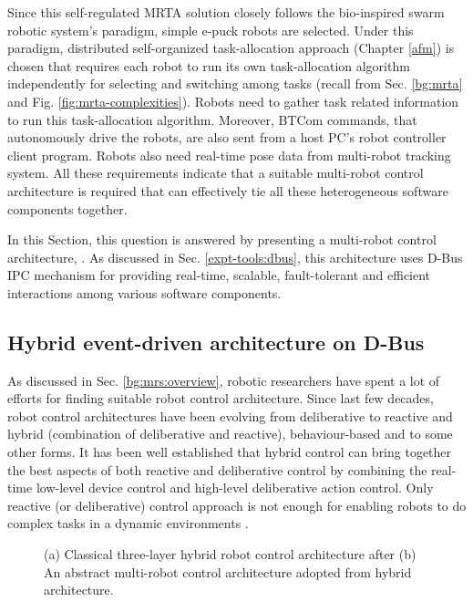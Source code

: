 Since  this self-regulated MRTA solution closely follows the bio-inspired swarm robotic system's paradigm,  simple e-puck robots are selected.  Under this paradigm,  distributed self-organized task-allocation approach (Chapter \ref{afm}) is chosen that requires each robot to run its own task-allocation algorithm independently for selecting and switching among tasks (recall from Sec. \ref{bg:mrta} and Fig. \ref{fig:mrta-complexities}).  Robots need to gather task related information to run this task-allocation algorithm. Moreover, BTCom  commands, that autonomously drive the robots, are also sent from a host PC's robot controller client program. Robots also need real-time pose data from multi-robot tracking system. All these requirements indicate that a suitable multi-robot control architecture is required that can effectively tie all these heterogeneous software components together.

In this Section,  this question is answered by presenting a multi-robot control architecture, .  As discussed in Sec. \ref{expt-tools:dbus}, this architecture uses D-Bus IPC mechanism for providing real-time, scalable, fault-tolerant and efficient interactions among various software components.
\subsection{Hybrid event-driven architecture on D-Bus}
As discussed in Sec. \ref{bg:mrs:overview}, robotic researchers have spent a lot of efforts for finding suitable robot control architecture. Since last few decades, robot control architectures have been evolving from deliberative to reactive and hybrid (combination of deliberative and reactive), behaviour-based and to some other forms. It has been well established that hybrid control can bring together the best aspects of both reactive and deliberative control by combining the real-time low-level device control and high-level deliberative action control. Only reactive (or deliberative) control approach is not enough for enabling robots to do complex tasks in a dynamic environments \cite{Gat1997}.
\begin{figure}[H]
\centering
{} 
\hspace{0.25cm}
\caption{(a) Classical three-layer hybrid robot control architecture after \protect{} 
(b) An abstract multi-robot control architecture adopted from hybrid architecture.}
\label{fig:3-layer-arch}
\end{figure}

